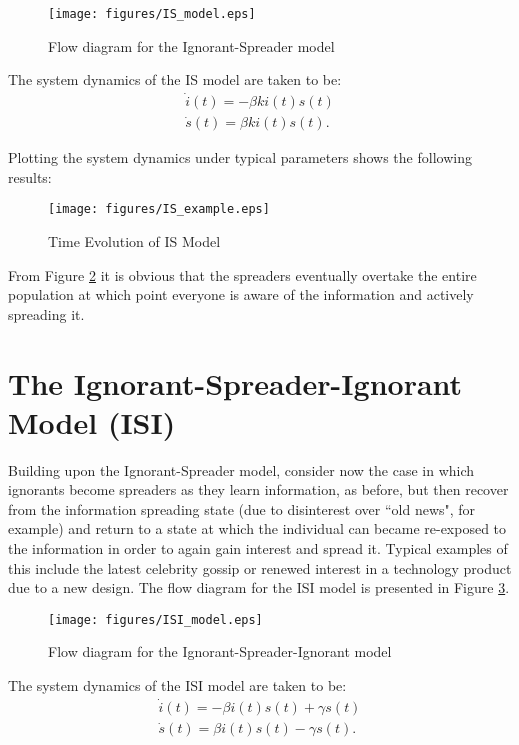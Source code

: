 \begin{figure}[!htbp] \centering
  \texttt{[image: figures/IS\_model.eps]}
  \caption{Flow diagram for the Ignorant-Spreader model}
  \label{fig:IS_model}
\end{figure}

\noindent The system dynamics of the IS model are taken to be:
\begin{equation}\label{eqn:IS_dynamics}
\left.\begin{aligned}
\dot{i}(t) = -\beta k i(t)s(t)\\
\dot{s}(t) = \beta k i(t)s(t).
\end{aligned}\right.
\end{equation}

\noindent Plotting the system dynamics under typical parameters shows the following results:

\begin{figure}[!htbp] \centering
  \texttt{[image: figures/IS\_example.eps]}
  \caption{Time Evolution of IS Model}
  \label{fig:IS}
\end{figure}

From Figure \ref{fig:IS} it is obvious that the spreaders eventually overtake the entire population at which point everyone is aware of the information and actively spreading it.

\section{The Ignorant-Spreader-Ignorant Model (ISI)}
Building upon the Ignorant-Spreader model, consider now the case in which ignorants become spreaders as they learn information, as before, but then recover from the information spreading state (due to disinterest over ``old news", for example) and return to a state at which the individual can became re-exposed to the information in order to again gain interest and spread it. Typical examples of this include the latest celebrity gossip or renewed interest in a technology product due to a new design. The flow diagram for the ISI model is presented in Figure \ref{fig:ISI_model}.

\begin{figure}[!htbp] \centering
  \texttt{[image: figures/ISI\_model.eps]}
  \caption{Flow diagram for the Ignorant-Spreader-Ignorant model}
  \label{fig:ISI_model}
\end{figure}

\noindent The system dynamics of the ISI model are taken to be:
\begin{equation}\label{eqn:ISI_dynamics}
\left.\begin{aligned}
\dot{i}(t) = -\beta i(t) s(t)+\gamma s(t)\\
\dot{s}(t) = \beta i(t) s(t)-\gamma s(t).
\end{aligned}\right.
\end{equation}


